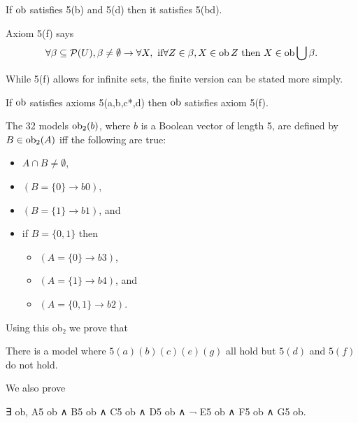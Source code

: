 \begin{theorem}\label{bd5}
	\leanok
	If $\operatorname{ob}$ satisfies 5(b) and 5(d) then it satisfies 5(bd).
\end{theorem}

\begin{definition}\label{CJ5f}
	\leanok
	Axiom 5(f) says
	\[
		\forall \beta \subseteq \mathcal P(U), \beta \ne \emptyset \rightarrow
		\forall X, \text{ if} \forall Z \in \beta, X \in \operatorname{ob} Z \text{ then } X \in \operatorname{ob} \bigcup \beta.
	\]
\end{definition}
While 5(f) allows for infinite sets, the finite version can be stated more simply.

\begin{theorem}\label{II22}
	\leanok
	If $\operatorname{ob}$ satisfies axioms 5(a,b,c*,d) then $\operatorname{ob}$ satisfies axiom 5(f).
\end{theorem}

\begin{definition}
	\leanok
The 32 models $\operatorname{ob}_2(b)$, where $b$ is a Boolean vector of length 5, are defined by $B\in\operatorname{ob}_2(A)$ iff
the following are true:
\begin{itemize}
	\item $A \cap B \ne \emptyset$,
	\item $(B = \{0\} \to b 0)$,
	\item $(B = \{1\} \to b 1)$, and
	\item if $B = \{0,1\}$ then
		\begin{itemize}
			\item $(A = \{0\} \to b 3)$,
			\item $(A = \{1\} \to b 4)$, and
			\item $(A = \{0,1\} \to b 2)$.
		\end{itemize}
\end{itemize}
\end{definition}

Using this ob₂ we prove that
\begin{theorem}
	\leanok
There is a model where $5(a)(b)(c)(e)(g)$ all hold but $5(d)$ and $5(f)$
do not hold.
\end{theorem}

We also prove
\begin{theorem}
\leanok
∃ ob, A5 ob ∧ B5 ob ∧ C5 ob ∧ D5 ob ∧ ¬ E5 ob ∧ F5 ob ∧ G5 ob.
\end{theorem}

